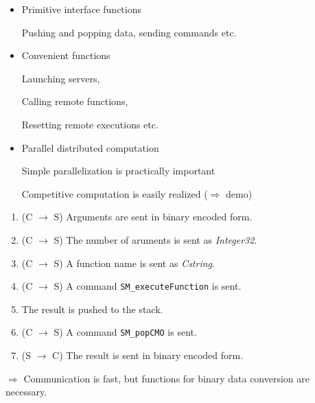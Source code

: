 \begin{slide}{}

\begin{itemize}
\item Primitive interface functions

Pushing and popping data, sending commands etc.

\item Convenient functions

Launching servers,

Calling remote functions,

Resetting remote executions etc.

\item Parallel distributed computation

Simple parallelization is practically important

Competitive computation is easily realized ($\Rightarrow$ demo)
\end{itemize}
\end{slide}

\begin{slide}{}

\begin{enumerate}
\item (C $\rightarrow$ S) Arguments are sent in binary encoded form.
\item (C $\rightarrow$ S) The number of aruments is sent as {\sl Integer32}.
\item (C $\rightarrow$ S) A function name is sent as {\sl Cstring}.
\item (C $\rightarrow$ S) A command {\tt SM\_executeFunction} is sent.
\item The result is pushed to the stack.
\item (C $\rightarrow$ S) A command {\tt SM\_popCMO} is sent.
\item (S $\rightarrow$ C) The result is sent in binary encoded form.
\end{enumerate}

$\Rightarrow$ Communication is fast, but functions for binary data
conversion are necessary.
\end{slide}

